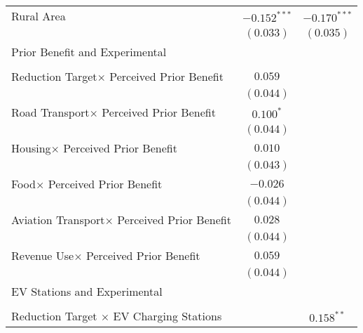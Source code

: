 \begin{center}
\begin{tiny}
\begin{longtable}{l@{} c@{} c@{}}
\quad Rural Area                                         & $-0.152^{***}$   & $-0.170^{***}$   \\
                                                         & $(0.033)$        & $(0.035)$        \\
Prior Benefit and Experimental                           &                  &                  \\
                                                         &                  &                  \\
\quad Reduction Target$\times$ Perceived Prior Benefit   & $0.059$          &                  \\
                                                         & $(0.044)$        &                  \\
\quad Road Transport$\times$ Perceived Prior Benefit     & $0.100^{*}$      &                  \\
                                                         & $(0.044)$        &                  \\
\quad Housing$\times$ Perceived Prior Benefit            & $0.010$          &                  \\
                                                         & $(0.043)$        &                  \\
\quad Food$\times$ Perceived Prior Benefit               & $-0.026$         &                  \\
                                                         & $(0.044)$        &                  \\
\quad Aviation Transport$\times$ Perceived Prior Benefit & $0.028$          &                  \\
                                                         & $(0.044)$        &                  \\
\quad Revenue Use$\times$ Perceived Prior Benefit        & $0.059$          &                  \\
                                                         & $(0.044)$        &                  \\
EV Stations and Experimental                             &                  &                  \\
                                                         &                  &                  \\
\quad Reduction Target $\times$ EV Charging Stations     &                  & $0.158^{**}$     \\

\end{longtable}
\end{tiny}
\end{center}
